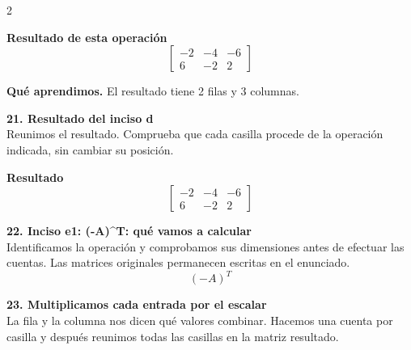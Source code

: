 \documentclass[11pt,a4paper,landscape]{article}
\begin{document}
\begin{multicols*}{2}
\begin{minipage}{\linewidth}
\par{}\par\smallskip
\par\smallskip \textbf{Resultado de esta operación}\[\begin{bmatrix}-2 & -4 & -6\\6 & -2 & 2\end{bmatrix}\]
\par\smallskip\textbf{Qué aprendimos.} El resultado tiene 2 filas y 3 columnas.
\end{minipage}\par\medskip
\noindent\begin{minipage}{\linewidth}\textbf{21. Resultado del inciso d}\\[2pt]Reunimos el resultado. Comprueba que cada casilla procede de la operación indicada, sin cambiar su posición.
\par\smallskip \textbf{Resultado}\[\begin{bmatrix}-2 & -4 & -6\\6 & -2 & 2\end{bmatrix}\]
\end{minipage}\par\medskip
\noindent\begin{minipage}{\linewidth}\textbf{22. Inciso e1: (-A)\textasciicircum{}T: qué vamos a calcular}\\[2pt]Identificamos la operación y comprobamos sus dimensiones antes de efectuar las cuentas. Las matrices originales permanecen escritas en el enunciado.
\[(-A)^T\]
\end{minipage}\par\medskip
\noindent\begin{minipage}{\linewidth}\textbf{23. Multiplicamos cada entrada por el escalar}\\[2pt]La fila y la columna nos dicen qué valores combinar. Hacemos una cuenta por casilla y después reunimos todas las casillas en la matriz resultado.

\end{minipage}
\end{multicols*}
\end{document}
